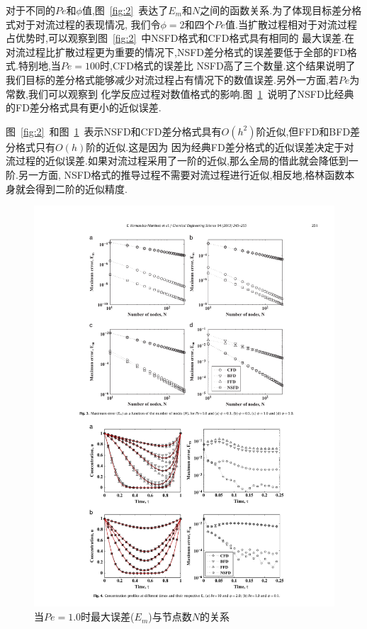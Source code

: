 \documentclass[a4paper,cs4size,adobefonts,cm-default,no-math]{ctexart}
\begin{document}
对于不同的$Pe$和$\phi$值,图~\ref{fig:2}~表达了$E_m$和$N$之间的函数关系.为了体现目标差分格式对于对流过程的表现情况,
我们令$\phi=2$和四个$Pe$值.当扩散过程相对于对流过程占优势时,可以观察到图~\ref{fig:2}~中NSFD格式和CFD格式具有相同的
最大误差.在对流过程比扩散过程更为重要的情况下,NSFD差分格式的误差要低于全部的FD格式.特别地,当$Pe=100$时,CFD格式的误差比
NSFD高了三个数量.这个结果说明了我们目标的差分格式能够减少对流过程占有情况下的数值误差.另外一方面,若$Pe$为常数,我们可以观察到
化学反应过程对数值格式的影响.图~\ref{fig:3}~说明了NSFD比经典的FD差分格式具有更小的近似误差.\par
图~\ref{fig:2}~和图~\ref{fig:3}~表示NSFD和CFD差分格式具有$O(h^2)$阶近似,但FFD和BFD差分格式只有$O(h)$阶的近似.这是因为
因为经典FD差分格式的近似误差决定于对流过程的近似误差.如果对流过程采用了一阶的近似,那么全局的借此就会降低到一阶.另一方面,
NSFD格式的推导过程不需要对流过程进行近似,相反地,格林函数本身就会得到二阶的近似精度.
\begin{figure}
\centering
\includegraphics[trim=80 390 80 60,clip]{./pic/f3.pdf}
\caption{当$Pe=1.0$时最大误差($E_m$)与节点数$N$的关系}\label{fig:3}
\end{figure}
\end{document}
